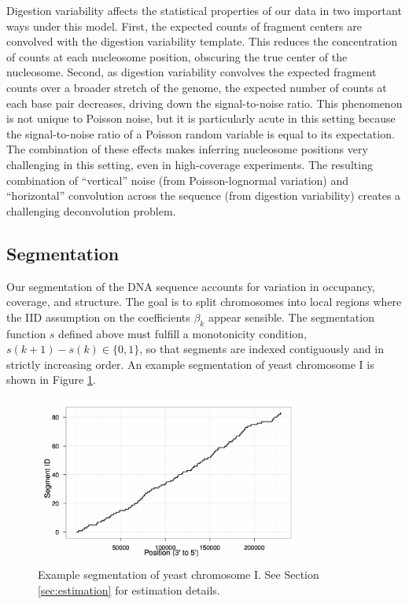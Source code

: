 Digestion variability affects the statistical properties of our data in two important ways under this model.
%
First, the expected counts of fragment centers are convolved with the digestion variability template.
This reduces the concentration of counts at each nucleosome position, obscuring the true center of the nucleosome.
%
Second, as digestion variability convolves the expected fragment counts over a broader stretch of the genome, the expected number of counts at each base pair decreases, driving down the signal-to-noise ratio.
This phenomenon is not unique to Poisson noise, but it is particularly acute in this setting because the signal-to-noise ratio of a Poisson random variable is equal to its expectation.
%
The combination of these effects makes inferring nucleosome positions very challenging in this setting, even in high-coverage experiments.
The resulting combination of ``vertical'' noise (from Poisson-lognormal variation) and ``horizontal'' convolution across the sequence (from digestion variability) creates a challenging deconvolution problem.


\subsection{Segmentation}
\label{sec:segmentation}

Our segmentation of the DNA sequence accounts for variation in occupancy, coverage, and structure.
%
The goal is to split chromosomes into local regions where the IID assumption on the coefficients $\beta_k$ appear sensible.
The segmentation function $s$ defined above must fulfill a monotonicity condition, $s(k+1)-s(k) \in \{0,1\}$, so that segments are indexed contiguously and in strictly increasing order.
An example segmentation of yeast chromosome I is shown in Figure \ref{fig:segmentation}.
%
\ifx\nofigures\undefined
\begin{figure}[t!]
\centering
 \includegraphics[width=0.8\textwidth]{figures/nucleosomes/plotRegions_H_1-combined_chrom01-small}
 \caption{Example segmentation of yeast chromosome I. See Section \ref{sec:estimation} for estimation details.\label{fig:segmentation}} 
\end{figure}
\fi

